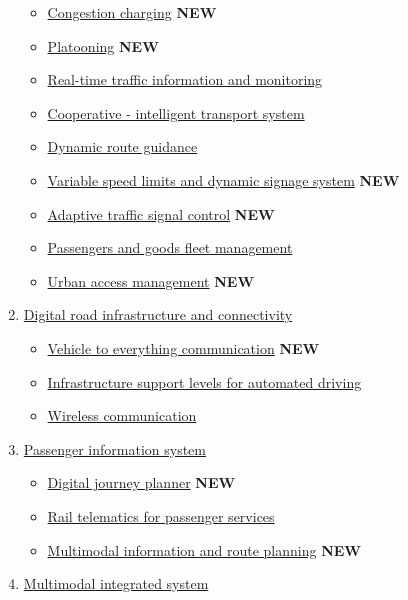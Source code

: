 \documentclass[
]{book}
\providecommand{\tightlist}{%
  \setlength{\itemsep}{0pt}\setlength{\parskip}{0pt}}
\begin{document}
\begin{enumerate}
  \begin{itemize}
  \tightlist
  \item
    \protect\hyperlink{congestion_charging}{Congestion charging} \textbf{NEW}
  \item
    \protect\hyperlink{platooning}{Platooning} \textbf{NEW}
  \item
    \protect\hyperlink{traffic_info_monitoring}{Real-time traffic information and monitoring}
  \item
    \protect\hyperlink{cits}{Cooperative - intelligent transport system}
  \item
    \protect\hyperlink{dynamic_route}{Dynamic route guidance}
  \item
    \protect\hyperlink{variable_speed}{Variable speed limits and dynamic signage system} \textbf{NEW}
  \item
    \protect\hyperlink{adaptive_traffic_control}{Adaptive traffic signal control} \textbf{NEW}
  \item
    \protect\hyperlink{p_g_fleet_management}{Passengers and goods fleet management}
  \item
    \protect\hyperlink{urban_access}{Urban access management} \textbf{NEW}
  \end{itemize}
\item
  \protect\hyperlink{digital}{Digital road infrastructure and connectivity}

  \begin{itemize}
  \tightlist
  \item
    \protect\hyperlink{v2x}{Vehicle to everything communication} \textbf{NEW}
  \item
    \protect\hyperlink{infrast_support_level}{Infrastructure support levels for automated driving}
  \item
    \protect\hyperlink{wireless_com}{Wireless communication}
  \end{itemize}
\item
  \protect\hyperlink{passenger}{Passenger information system}

  \begin{itemize}
  \tightlist
  \item
    \protect\hyperlink{djp}{Digital journey planner} \textbf{NEW}
  \item
    \protect\hyperlink{telematics_passenger}{Rail telematics for passenger services}
  \item
    \protect\hyperlink{info_and_route_planning}{Multimodal information and route planning} \textbf{NEW}
  \end{itemize}
\item
  \protect\hyperlink{multimodal}{Multimodal integrated system}


\end{enumerate}
\end{document}
